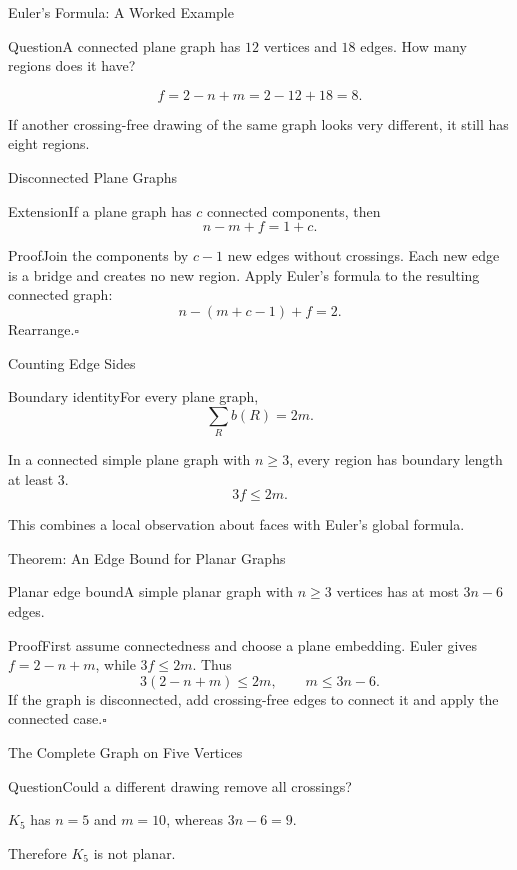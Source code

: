 \documentclass[aspectratio=169,11pt]{beamer}
\newcommand{\Thm}[2]{\begin{block}{#1}#2\end{block}}
\renewcommand{\Proof}[1]{\begin{block}{Proof}\normalsize #1\end{block}}
\newcommand{\Question}[1]{\begin{block}{Question}#1\end{block}}
\newcommand{\gap}{\par\medskip}
\begin{document}
\begin{frame}{Euler's Formula: A Worked Example}
\large
\Question{A connected plane graph has $12$ vertices and $18$ edges. How many regions does it have?}
\[f=2-n+m=2-12+18=8.\]
\gap If another crossing-free drawing of the same graph looks very different, it still has eight regions.
\end{frame}
\begin{frame}{Disconnected Plane Graphs}
\large
\Thm{Extension}{If a plane graph has $c$ connected components, then\[n-m+f=1+c.\]}
\Proof{Join the components by $c-1$ new edges without crossings. Each new edge is a bridge and creates no new region. Apply Euler's formula to the resulting connected graph:\[n-(m+c-1)+f=2.\]Rearrange.\hfill$\square$}
\end{frame}
\begin{frame}{Counting Edge Sides}
\large
\Thm{Boundary identity}{For every plane graph,\[\sum_R b(R)=2m.\]}
\gap In a connected simple plane graph with $n\ge3$, every region has boundary length at least $3$.
\[3f\le 2m.\]
\gap This combines a local observation about faces with Euler's global formula.
\end{frame}
\begin{frame}{Theorem: An Edge Bound for Planar Graphs}
\large
\Thm{Planar edge bound}{A simple planar graph with $n\ge3$ vertices has at most $3n-6$ edges.}
\Proof{First assume connectedness and choose a plane embedding. Euler gives $f=2-n+m$, while $3f\le2m$. Thus\[3(2-n+m)\le2m,\qquad m\le3n-6.\]If the graph is disconnected, add crossing-free edges to connect it and apply the connected case.\hfill$\square$}
\end{frame}
\begin{frame}{The Complete Graph on Five Vertices}
\large
\begin{center}\end{center}
\Question{Could a different drawing remove all crossings?}
$K_5$ has $n=5$ and $m=10$, whereas $3n-6=9$.
\gap Therefore $K_5$ is not planar.
\end{frame}
\end{document}
